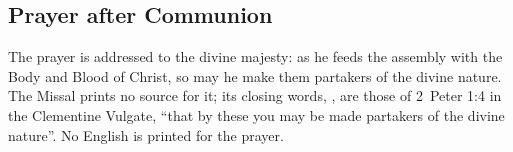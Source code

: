 \subsection{Prayer after Communion}
\label{proper-prayer-after-communion}


\noindent The prayer is addressed to the divine majesty: as he feeds the
assembly with the Body and Blood of Christ, so may he make them partakers of
the divine nature. The Missal prints no source for it; its closing words,
, are those of 2~Peter 1:4 in the
Clementine Vulgate, ``that by these you may be made partakers of the divine
nature''. No English is printed for the prayer.
